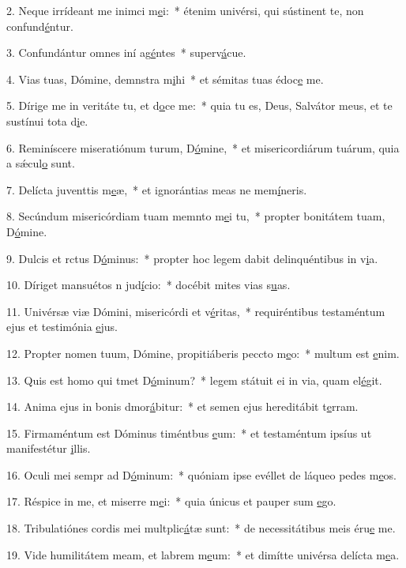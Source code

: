 2. Neque irrídeant me inimci m\uline{e}i:~* étenim univérsi, qui sústinent te, non confund\uline{é}ntur.\par 
3. Confundántur omnes iní ag\uline{é}ntes~* superv\uline{á}cue.\par 
4. Vias tuas, Dómine, demnstra m\uline{i}hi~* et sémitas tuas édoc\uline{e} me.\par 
5. Dírige me in veritáte tu, et d\uline{o}ce me:~* quia tu es, Deus, Salvátor meus, et te sustínui tota d\uline{i}e.\par 
6. Reminíscere miseratiónum turum, D\uline{ó}mine,~* et misericordiárum tuárum, quia a sǽcul\uline{o} sunt.\par 
7. Delícta juventtis m\uline{e}æ,~* et ignorántias meas ne mem\uline{í}neris.\par 
8. Secúndum misericórdiam tuam memnto m\uline{e}i tu,~* propter bonitátem tuam, D\uline{ó}mine.\par 
9. Dulcis et rctus D\uline{ó}minus:~* propter hoc legem dabit delinquéntibus in v\uline{i}a.\par 
10. Díriget mansuétos n jud\uline{í}cio:~* docébit mites vias s\uline{u}as.\par 
11. Univérsæ viæ Dómini, misericórdi et v\uline{é}ritas,~* requiréntibus testaméntum ejus et testimónia \uline{e}jus.\par 
12. Propter nomen tuum, Dómine, propitiáberis peccto m\uline{e}o:~* multum est \uline{e}nim.\par 
13. Quis est homo qui tmet D\uline{ó}minum?~* legem státuit ei in via, quam el\uline{é}git.\par 
14. Anima ejus in bonis dmor\uline{á}bitur:~* et semen ejus hereditábit t\uline{e}rram.\par 
15. Firmaméntum est Dóminus timéntbus \uline{e}um:~* et testaméntum ipsíus ut manifestétur \uline{i}llis.\par 
16. Oculi mei sempr ad D\uline{ó}minum:~* quóniam ipse evéllet de láqueo pedes m\uline{e}os.\par 
17. Réspice in me, et miserre m\uline{e}i:~* quia únicus et pauper sum \uline{e}go.\par 
18. Tribulatiónes cordis mei multplic\uline{á}tæ sunt:~* de necessitátibus meis éru\uline{e} me.\par 
19. Vide humilitátem meam, et labrem m\uline{e}um:~* et dimítte univérsa delícta m\uline{e}a.\par 
